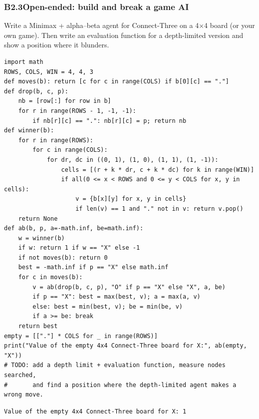 \documentclass[11pt]{article}
\begin{document}
\subsubsection*{B2.3\quad Open-ended: build and break a game AI}
Write a Minimax + alpha--beta agent for Connect-Three on a 4$\times$4 board (or your own game). Then write an evaluation function for a depth-limited version and show a position where it blunders.
\begin{lstlisting}[style=py]
import math
ROWS, COLS, WIN = 4, 4, 3
def moves(b): return [c for c in range(COLS) if b[0][c] == "."]
def drop(b, c, p):
    nb = [row[:] for row in b]
    for r in range(ROWS - 1, -1, -1):
        if nb[r][c] == ".": nb[r][c] = p; return nb
def winner(b):
    for r in range(ROWS):
        for c in range(COLS):
            for dr, dc in ((0, 1), (1, 0), (1, 1), (1, -1)):
                cells = [(r + k * dr, c + k * dc) for k in range(WIN)]
                if all(0 <= x < ROWS and 0 <= y < COLS for x, y in cells):
                    v = {b[x][y] for x, y in cells}
                    if len(v) == 1 and "." not in v: return v.pop()
    return None
def ab(b, p, a=-math.inf, be=math.inf):
    w = winner(b)
    if w: return 1 if w == "X" else -1
    if not moves(b): return 0
    best = -math.inf if p == "X" else math.inf
    for c in moves(b):
        v = ab(drop(b, c, p), "O" if p == "X" else "X", a, be)
        if p == "X": best = max(best, v); a = max(a, v)
        else: best = min(best, v); be = min(be, v)
        if a >= be: break
    return best
empty = [["."] * COLS for _ in range(ROWS)]
print("Value of the empty 4x4 Connect-Three board for X:", ab(empty, "X"))
# TODO: add a depth limit + evaluation function, measure nodes searched,
#       and find a position where the depth-limited agent makes a wrong move.
\end{lstlisting}
\begin{lstlisting}[style=out]
Value of the empty 4x4 Connect-Three board for X: 1
\end{lstlisting}
\newpage
{}
\end{document}

